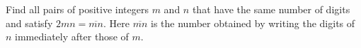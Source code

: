 Find all pairs of positive integers $m$ and $n$ that have the same number of digits and satisfy $2mn=\overline{mn}$. Here $\overline{mn}$ is the number obtained by writing the digits of $n$ immediately after those of $m$.
